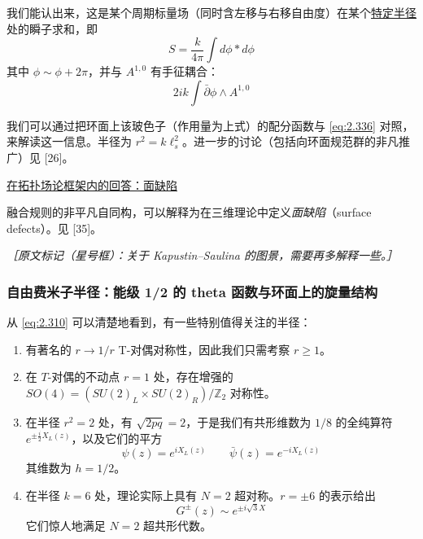 我们能认出来，这是某个周期标量场（同时含左移与右移自由度）在某个\underline{特定半径}处的瞬子求和，即
\begin{equation}
  S=\frac{k}{4\pi}\int d\phi*d\phi
  \tag{2.337}
  \label{eq:2.337}
\end{equation}
其中 $\phi\sim\phi+2\pi$，并与 $A^{1,0}$ 有手征耦合：
\begin{equation}
  2ik\int\bar\partial\phi\wedge A^{1,0}
  \tag{2.338}
  \label{eq:2.338}
\end{equation}

我们可以通过把环面上该玻色子（作用量为上式）的配分函数与 \eqref{eq:2.336} 对照，来解读这一信息。半径为 $r^2=k\ell_s^2$。进一步的讨论（包括向环面规范群的非凡推广）见 [26]。

\underline{在拓扑场论框架内的回答：面缺陷}

融合规则的非平凡自同构，可以解释为在三维理论中定义\emph{面缺陷}（surface defects）。见 [35]。

{\small\itshape ［原文标记（星号框）：关于 Kapustin–Saulina 的图景，需要再多解释一些。］}

\subsubsection{自由费米子半径：能级 1/2 的 theta 函数与环面上的旋量结构} %

从 \eqref{eq:2.310} 可以清楚地看到，有一些特别值得关注的半径：

\begin{enumerate}
  \item 有著名的 $r\to1/r$ T-对偶对称性，因此我们只需考察 $r\ge1$。

  \item 在 $T$-对偶的不动点 $r=1$ 处，存在增强的 $SO(4)=(SU(2)_L\times SU(2)_R)/\mathbb{Z}_2$ 对称性。

  \item 在半径 $r^2=2$ 处，有 $\sqrt{2pq}=2$，于是我们有共形维数为 $1/8$ 的全纯算符 $e^{\pm\frac{i}{2}X_L(z)}$，以及它们的平方
  \begin{equation}
    \psi(z)=e^{iX_L(z)}
    \qquad
    \bar\psi(z)=e^{-iX_L(z)}
    \tag{2.339}
    \label{eq:2.339}
  \end{equation}
  其维数为 $h=1/2$。

  \item 在半径 $k=6$ 处，理论实际上具有 $N=2$ 超对称。$r=\pm6$ 的表示给出
  \begin{equation}
    G^{\pm}(z)\sim e^{\pm i\sqrt{3}X}
    \tag{2.340}
    \label{eq:2.340}
  \end{equation}
  它们惊人地满足 $N=2$ 超共形代数。
\end{enumerate}

